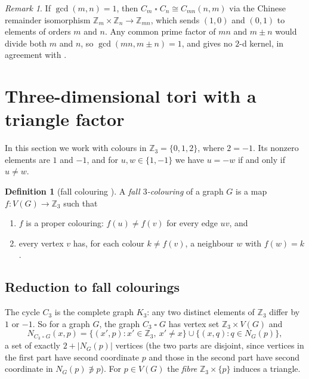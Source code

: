 \documentclass[11pt]{article}
\theoremstyle{plain}
\theoremstyle{definition}
\newtheorem{definition}[definition]{Definition}
\theoremstyle{remark}
\newtheorem{remark}[remark]{Remark}
\newcommand{\Z}{\mathbb{Z}}
\newcommand{\T}{\mathbin{\square}}
\begin{document}
\begin{remark}
If $\gcd(m,n) = 1$, then $C_m \T C_n \cong C_{mn}(n, m)$ via the Chinese remainder
isomorphism $\Z_m \times \Z_n \to \Z_{mn}$, which sends $(1,0)$ and $(0,1)$ to elements of
orders $m$ and $n$. Any common prime factor of $mn$ and $m \pm n$ would divide both $m$ and
$n$, so $\gcd(mn, m \pm n) = 1$, and  gives no $2$-d kernel, in agreement
with .
\end{remark}

\section{Three-dimensional tori with a triangle factor}\label{sec:3d}

In this section we work with colours in $\Z_3 = \{0, 1, 2\}$, where $2 = -1$. Its nonzero
elements are $1$ and $-1$, and for $u, w \in \{1, -1\}$ we have $u = -w$ if and only if
$u \ne w$.

\begin{definition}[fall colouring \cite{Dunbar2000}]\label{def:fall}
A \emph{fall $3$-colouring} of a graph $G$ is a map $f : V(G) \to \Z_3$ such that
\begin{enumerate}[label=(F\arabic*)]
  \item\label{F1} $f$ is a proper colouring: $f(u) \ne f(v)$ for every edge $uv$, and
  \item\label{F2} every vertex $v$ has, for each colour $k \ne f(v)$, a neighbour $w$ with
        $f(w) = k$.
\end{enumerate}
\end{definition}

\subsection{Reduction to fall colourings}

The cycle $C_3$ is the complete graph $K_3$: any two distinct elements of $\Z_3$ differ by
$1$ or $-1$. So for a graph $G$, the graph $C_3 \T G$ has vertex set $\Z_3 \times V(G)$ and
\begin{equation}\label{eq:nbhd-3}
N_{C_3 \T G}(x, p) = \{(x', p) : x' \in \Z_3,\ x' \ne x\} \cup \{(x, q) : q \in N_G(p)\},
\end{equation}
a set of exactly $2 + |N_G(p)|$ vertices (the two parts are disjoint, since vertices in the
first part have second coordinate $p$ and those in the second part have second coordinate in
$N_G(p) \not\ni p$). For $p \in V(G)$ the \emph{fibre} $\Z_3 \times \{p\}$ induces a triangle.
\end{document}
